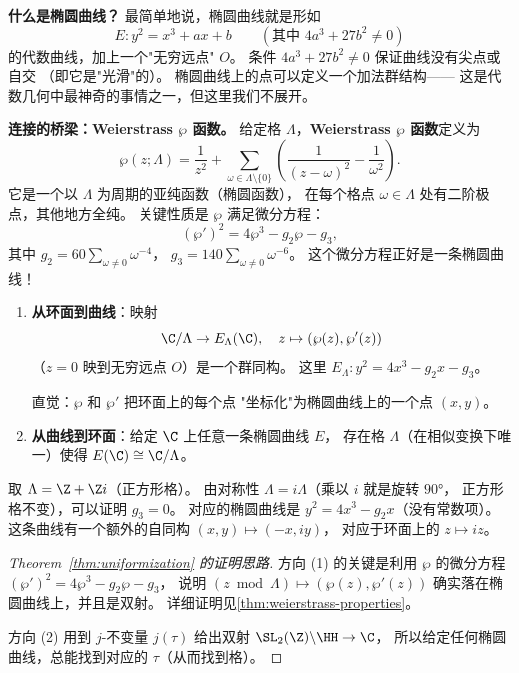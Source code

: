 \textbf{什么是椭圆曲线？}
最简单地说，椭圆曲线就是形如
\[
  E\colon y^2 = x^3 + ax + b \qquad (\text{其中 } 4a^3 + 27b^2 \neq 0)
\]
的代数曲线，加上一个"无穷远点" $O$。
条件 $4a^3 + 27b^2 \neq 0$ 保证曲线没有尖点或自交
（即它是"光滑"的）。
椭圆曲线上的点可以定义一个加法群结构——
这是代数几何中最神奇的事情之一，但这里我们不展开。

\textbf{连接的桥梁：Weierstrass $\wp$ 函数。}
给定格 $\Lambda$，\textbf{Weierstrass $\wp$ 函数}定义为
\[
  \wp(z;\Lambda) = \frac{1}{z^2} + \sum_{\omega \in \Lambda \setminus \{0\}}
  \left(\frac{1}{(z-\omega)^2} - \frac{1}{\omega^2}\right).
\]
它是一个以 $\Lambda$ 为周期的亚纯函数（椭圆函数），
在每个格点 $\omega \in \Lambda$ 处有二阶极点，其他地方全纯。
关键性质是 $\wp$ 满足微分方程：
\[
  (\wp')^2 = 4\wp^3 - g_2\wp - g_3,
\]
其中 $g_2 = 60\sum_{\omega \neq 0} \omega^{-4}$，
$g_3 = 140\sum_{\omega \neq 0} \omega^{-6}$。
这个微分方程正好是一条椭圆曲线！

\begin{theorem}[均匀化定理]
\label{thm:uniformization}
\leavevmode
\begin{enumerate}
  \item \textbf{从环面到曲线}：映射
    \[
      \C/\Lambda \to E_\Lambda(\C), \quad
      z \mapsto (\wp(z), \wp'(z))
    \]
    （$z = 0$ 映到无穷远点 $O$）是一个群同构。
    这里 $E_\Lambda\colon y^2 = 4x^3 - g_2 x - g_3$。
    
    直觉：$\wp$ 和 $\wp'$ 把环面上的每个点
    "坐标化"为椭圆曲线上的一个点 $(x,y)$。

  \item \textbf{从曲线到环面}：给定 $\C$ 上任意一条椭圆曲线 $E$，
    存在格 $\Lambda$（在相似变换下唯一）使得
    $E(\C) \cong \C/\Lambda$。
\end{enumerate}
\end{theorem}

\begin{example}[正方形格对应的椭圆曲线]
\label{ex:square-lattice-curve}
取 $\Lambda = \Z + \Z i$（正方形格）。
由对称性 $\Lambda = i\Lambda$（乘以 $i$ 就是旋转 $90°$，
正方形格不变），可以证明 $g_3 = 0$。
对应的椭圆曲线是 $y^2 = 4x^3 - g_2 x$（没有常数项）。
这条曲线有一个额外的自同构 $(x,y) \mapsto (-x, iy)$，
对应于环面上的 $z \mapsto iz$。
\end{example}

\begin{proof}[Theorem~\ref{thm:uniformization} 的证明思路]
方向 (1) 的关键是利用 $\wp$ 的微分方程
$(\wp')^2 = 4\wp^3 - g_2\wp - g_3$，
说明 $(z \bmod \Lambda) \mapsto (\wp(z), \wp'(z))$
确实落在椭圆曲线上，并且是双射。
详细证明见\cref{thm:weierstrass-properties}。

方向 (2) 用到 $j$-不变量 $j(\tau)$ 给出双射
$\SL_2(\Z) \backslash \HH \to \C$，
所以给定任何椭圆曲线，总能找到对应的 $\tau$（从而找到格）。
\end{proof}


